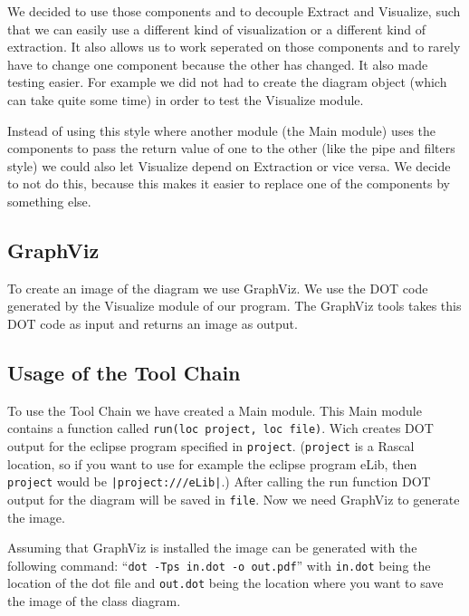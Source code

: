 \documentclass[a4paper,11pt]{article}
\begin{document}
	We decided to use those components and to decouple Extract and Visualize, such that we can easily use a different kind of visualization or a different kind of extraction.
	It also allows us to work seperated on those components and to rarely have to change one component because the other has changed.
	It also made testing easier. For example we did not had to create the diagram object (which can take quite some time) in order to test the Visualize module.
	
	Instead of using this style where another module (the Main module) uses the components to pass the return value of one
	to the other (like the pipe and filters style) we could also let Visualize depend on Extraction or vice versa.
	We decide to not do this, because this makes it easier to replace one of the components by something else.
	
	\subsection{GraphViz}
	
	To create an image of the diagram we use GraphViz.
	We use the DOT code generated by the Visualize module of our program.
	The GraphViz tools takes this DOT code as input and returns an image as output.
	
	\subsection{Usage of the Tool Chain}
	To use the Tool Chain we have created a Main module.
	This Main module contains a function called \texttt{run(loc project, loc file)}.
	Wich creates DOT output for the eclipse program specified in \texttt{project}.
	(\texttt{project} is a Rascal location, so if you want to use for example the eclipse program eLib, then
	\texttt{project} would be \texttt{|project:///eLib|}.)
	After calling the run function DOT output for the diagram will be saved in \texttt{file}.
	Now we need GraphViz to generate the image.
	
	Assuming that GraphViz is installed the image can be generated with the following command:
	``\texttt{dot -Tps in.dot -o out.pdf}'' with \texttt{in.dot} being the location of the dot file and \texttt{out.dot}
	being the location where you want to save the image of the class diagram.
	
	
	
\end{document}
